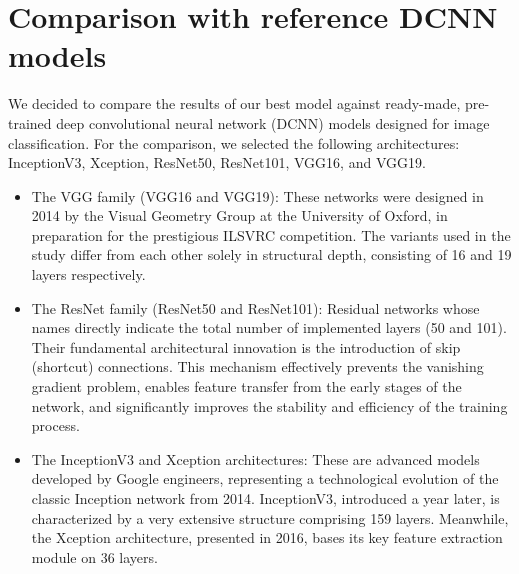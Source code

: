 \documentclass{article}
\begin{document}
\section{Comparison with reference DCNN models}
\label{sec:cnn_models}
We decided to compare the results of our best model against ready-made, pre-trained deep convolutional neural network (DCNN) models designed for image classification. For the comparison, we selected the following architectures: InceptionV3\cite{inceptionv3}, Xception\cite{xception}, ResNet50\cite{resnet}, ResNet101\cite{resnet}, VGG16\cite{vgg}, and VGG19\cite{vgg}.

\begin{itemize}
    \item The VGG family (VGG16 and VGG19): These networks were designed in 2014 by the Visual Geometry Group at the University of Oxford, in preparation for the prestigious ILSVRC competition. The variants used in the study differ from each other solely in structural depth, consisting of 16 and 19 layers respectively.
    \item The ResNet family (ResNet50 and ResNet101): Residual networks whose names directly indicate the total number of implemented layers (50 and 101). Their fundamental architectural innovation is the introduction of skip (shortcut) connections. This mechanism effectively prevents the vanishing gradient problem, enables feature transfer from the early stages of the network, and significantly improves the stability and efficiency of the training process.
    \item The InceptionV3 and Xception architectures: These are advanced models developed by Google engineers, representing a technological evolution of the classic Inception network from 2014. InceptionV3, introduced a year later, is characterized by a very extensive structure comprising 159 layers. Meanwhile, the Xception architecture, presented in 2016, bases its key feature extraction module on 36 layers.
\end{itemize}
\end{document}
